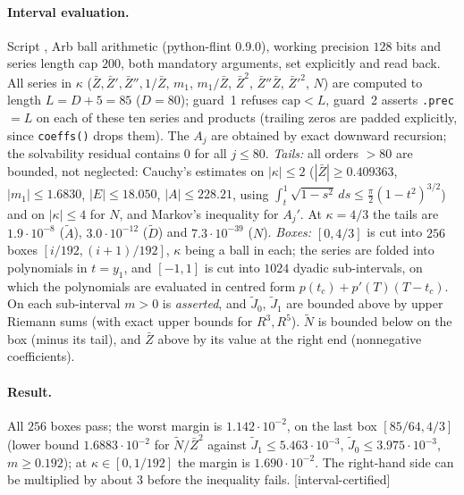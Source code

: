 \documentclass[11pt,a4paper]{article}
\theoremstyle{remark}
\theoremstyle{definition}
\theoremstyle{plain}
\theoremstyle{remark}
\newcommand{\st}[1]{\textsf{[#1]}}
\newcommand{\Zb}{\bar Z}
\begin{document}
\paragraph{Interval evaluation.} Script , Arb ball arithmetic
(python-flint 0.9.0), working precision $128$ bits and series length cap $200$, both mandatory arguments, set
explicitly and read back. All series in $\kappa$ ($\Zb,\Zb',\Zb'',1/\Zb$, $m_1$, $m_1/\Zb$, $\Zb^2$, $\Zb''\Zb$, $\Zb'^2$,
$N$) are computed to length $L=D+5=85$ ($D=80$); guard~1 refuses $\mathrm{cap}<L$, guard~2 asserts
\texttt{.prec}${}=L$ on each of these ten series and products (trailing zeros are padded explicitly, since
\texttt{coeffs()} drops them). The $A_j$ are obtained by exact downward recursion; the solvability residual
contains $0$ for all $j\le80$. \emph{Tails:} all orders $>80$ are bounded, not neglected: Cauchy's estimates on
$|\kappa|\le2$ ($|\Zb|\ge0.409363$, $|m_1|\le1.6830$, $|E|\le18.050$, $|A|\le228.21$, using
$\int_t^1\sqrt{1-s^2}\,ds\le\frac\pi2(1-t^2)^{3/2}$) and on $|\kappa|\le4$ for $N$, and Markov's inequality for
$A_j'$. At $\kappa=4/3$ the tails are $1.9\cdot10^{-8}$ ($\tilde A$), $3.0\cdot10^{-12}$ ($\tilde D$) and
$7.3\cdot10^{-39}$ ($N$).
\emph{Boxes:} $[0,4/3]$ is cut into $256$ boxes $[i/192,(i+1)/192]$, $\kappa$ being a ball in each; the series are
folded into polynomials in $t=y_1$, and $[-1,1]$ is cut into $1024$ dyadic sub-intervals, on which the polynomials
are evaluated in centred form $p(t_c)+p'(T)(T-t_c)$. On each sub-interval $m>0$ is \emph{asserted}, and $\tilde J_0$,
$\tilde J_1$ are bounded above by upper Riemann sums (with exact upper bounds for $R^3,R^5$). $\tilde N$ is bounded
below on the box (minus its tail), and $\Zb$ above by its value at the right end (nonnegative coefficients).

\paragraph{Result.} All $256$ boxes pass; the worst margin is $1.142\cdot10^{-2}$, on the last box
$[85/64,4/3]$ (lower bound $1.6883\cdot10^{-2}$ for $\tilde N/\Zb^2$ against $\tilde J_1\le5.463\cdot10^{-3}$,
$\tilde J_0\le3.975\cdot10^{-3}$, $m\ge0.192$); at $\kappa\in[0,1/192]$ the margin is $1.690\cdot10^{-2}$.
The right-hand side can be multiplied by about $3$ before the inequality fails. \st{interval-certified}
\end{document}
